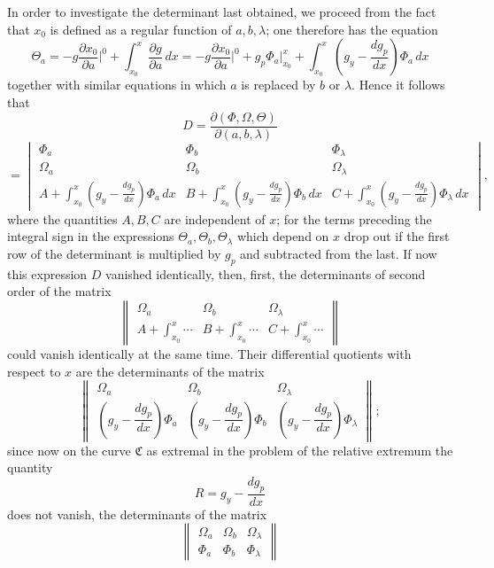 \documentclass[11pt,a4paper,leqno]{article}
\begin{document}
In order to investigate the determinant last obtained, we proceed from the fact that $x_0$ is defined as a regular function of $a,b,\lambda$; one therefore has the equation
\[
\Theta_a=-g\frac{\partial x_0}{\partial a}\bigg|^0+\int_{x_0}^{x}\frac{\partial g}{\partial a}\,dx
=-g\frac{\partial x_0}{\partial a}\bigg|^0+g_p\Phi_a\bigg|_{x_0}^{x}+\int_{x_0}^{x}\left(g_y-\frac{dg_p}{dx}\right)\Phi_a\,dx
\]
together with similar equations in which $a$ is replaced by $b$ or $\lambda$. Hence it follows that
\[
D=\frac{\partial(\Phi,\Omega,\Theta)}{\partial(a,b,\lambda)}
\]
\[
=\begin{vmatrix}
\Phi_a&\Phi_b&\Phi_\lambda\\[.6ex]
\Omega_a&\Omega_b&\Omega_\lambda\\[.6ex]
A+\displaystyle\int_{x_0}^{x}\left(g_y-\frac{dg_p}{dx}\right)\Phi_a\,dx&B+\displaystyle\int_{x_0}^{x}\left(g_y-\frac{dg_p}{dx}\right)\Phi_b\,dx&C+\displaystyle\int_{x_0}^{x}\left(g_y-\frac{dg_p}{dx}\right)\Phi_\lambda\,dx
\end{vmatrix},
\]
where the quantities $A,B,C$ are independent of $x$; for the terms preceding the integral sign in the expressions $\Theta_a,\Theta_b,\Theta_\lambda$ which depend on $x$ drop out if the first row of the determinant is multiplied by $g_p$ and subtracted from the last. If now this expression $D$ vanished identically, then, first, the determinants of second order of the matrix
\begin{equation}\tag{53}
\left\|\begin{array}{ccc}
\Omega_a&\Omega_b&\Omega_\lambda\\[.8ex]
A+\displaystyle\int_{x_0}^{x}\cdots&B+\displaystyle\int_{x_0}^{x}\cdots&C+\displaystyle\int_{x_0}^{x}\cdots
\end{array}\right\|
\end{equation}
could vanish identically at the same time. Their differential quotients with respect to $x$ are the determinants of the matrix
\[
\left\|\begin{array}{ccc}
\Omega_a&\Omega_b&\Omega_\lambda\\[.8ex]
\left(g_y-\dfrac{dg_p}{dx}\right)\Phi_a&
\left(g_y-\dfrac{dg_p}{dx}\right)\Phi_b&
\left(g_y-\dfrac{dg_p}{dx}\right)\Phi_\lambda
\end{array}\right\|;
\]
since now on the curve $\mathfrak{C}$ as extremal in the problem of the relative extremum the quantity
\[
R=g_y-\frac{dg_p}{dx}
\]
does not vanish, the determinants of the matrix
\[
\left\|\begin{array}{ccc}
\Omega_a&\Omega_b&\Omega_\lambda\\
\Phi_a&\Phi_b&\Phi_\lambda
\end{array}\right\|
\]
\end{document}
